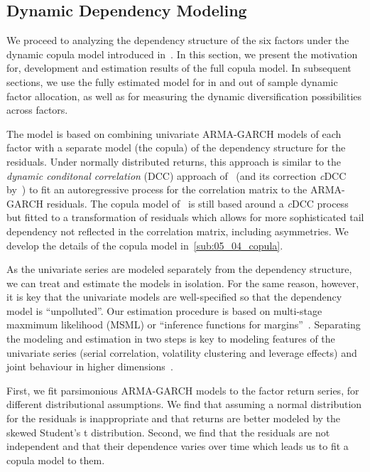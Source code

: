 
\subsection{Dynamic Dependency Modeling}
\label{sub:05_01_intro}

We proceed to analyzing the dependency structure of the six factors under the dynamic copula model introduced in~\textcite{ChristoffersenLanglois2013}. In this section, we present the motivation for, development and estimation results of the full copula model. In subsequent sections, we use the fully estimated model for in and out of sample dynamic factor allocation, as well as for measuring the dynamic diversification possibilities across factors.

The model is based on combining univariate ARMA-GARCH models of each factor with a separate model (the copula) of the dependency structure for the residuals. Under normally distributed returns, this approach is similar to the \emph{dynamic conditonal correlation} (DCC) approach of~\textcite{Engle2002} (and its correction \emph{c}DCC by~\textcite{Aielli2013}) to fit an autoregressive process for the correlation matrix to the ARMA-GARCH residuals. The copula model of~\textcite{ChristoffersenLanglois2013} is still based around a \emph{c}DCC process but fitted to a transformation of residuals which allows for more sophisticated tail dependency not reflected in the correlation matrix, including asymmetries. We develop the details of the copula model in~\autoref{sub:05_04_copula}.

As the univariate series are modeled separately from the dependency structure, we can treat and estimate the models in isolation. For the same reason, however, it is key that the univariate models are well-specified so that the dependency model is ``unpolluted''. Our estimation procedure is based on multi-stage maxmimum likelihood (MSML) or ``inference functions for margins''~\autocite{Joe1997}. Separating the modeling and estimation in two steps is key to modeling features of the univariate series (serial correlation, volatility clustering and leverage effects) and joint behaviour in higher dimensions~\autocite{Patton2006}.

First, we fit parsimonious ARMA-GARCH models to the factor return series, for different distributional assumptions. We find that assuming a normal distribution for the residuals is inappropriate and that returns are better modeled by the skewed Student's t distribution. Second, we find that the residuals are not independent and that their dependence varies over time which leads us to fit a copula model to them.

